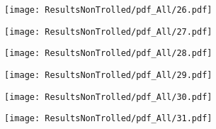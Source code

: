 {  \centerline{\texttt{[image: ResultsNonTrolled/pdf\_All/26.pdf]}  } }


{  \centerline{\texttt{[image: ResultsNonTrolled/pdf\_All/27.pdf]}  } }


{  \centerline{\texttt{[image: ResultsNonTrolled/pdf\_All/28.pdf]}  } }


{  \centerline{\texttt{[image: ResultsNonTrolled/pdf\_All/29.pdf]}  } }


{  \centerline{\texttt{[image: ResultsNonTrolled/pdf\_All/30.pdf]}  } }


{  \centerline{\texttt{[image: ResultsNonTrolled/pdf\_All/31.pdf]}  } }


